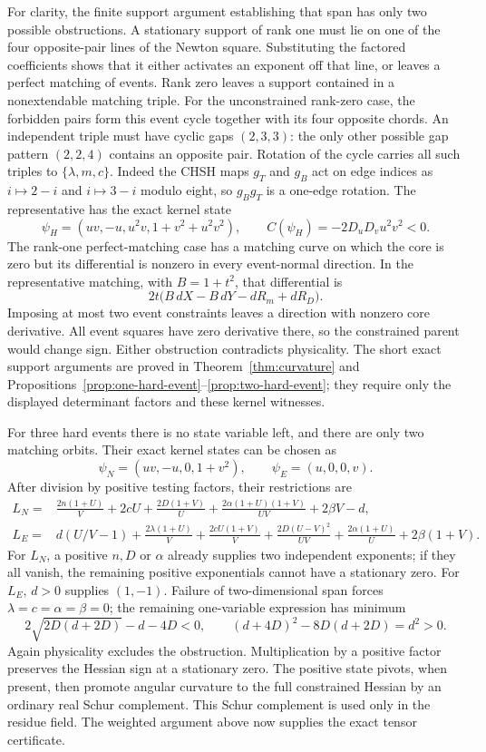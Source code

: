 For clarity, the finite support argument establishing that span has only
two possible obstructions.  A stationary support of rank one must lie on
one of the four opposite-pair lines of the Newton square.  Substituting the
factored coefficients shows that it either activates an exponent off that
line, or leaves a perfect matching of events.  Rank zero leaves a support
contained in a nonextendable matching triple.  For the unconstrained rank-zero case, the forbidden pairs form this
event cycle together with its four opposite chords.  An independent triple
must have cyclic gaps $(2,3,3)$: the only other possible gap pattern
$(2,2,4)$ contains an opposite pair.  Rotation of the cycle carries all such
triples to $\{\lambda,m,c\}$.  Indeed the CHSH maps $g_T$ and $g_B$ act on
edge indices as $i\mapsto2-i$ and $i\mapsto3-i$ modulo eight, so
$g_Bg_T$ is a one-edge rotation.  The representative has the exact kernel state
\[
 \psi_H=(uv,-u,u^2v,1+v^2+u^2v^2),\qquad
 C(\psi_H)=-2D_uD_vu^2v^2<0.
\]
The rank-one perfect-matching case has a
matching curve on which the core is zero but its differential is nonzero
in every event-normal direction.  In the representative matching, with
$B=1+t^2$, that differential is
\[
              2t\big(B\,dX-B\,dY-dR_m+dR_D\big).
\]
Imposing at most two event constraints leaves a direction with nonzero
core derivative.  All event squares have zero derivative there, so the
constrained parent would change sign.  Either obstruction contradicts
physicality.  The short exact support arguments are proved in
Theorem~\ref{thm:curvature} and
Propositions~\ref{prop:one-hard-event}--\ref{prop:two-hard-event}; they require
only the displayed determinant factors and these kernel witnesses.

For three hard events there is no state variable left, and there are only
two matching orbits.  Their exact kernel states can be chosen as
\[
 \psi_N=(uv,-u,0,1+v^2),\qquad \psi_E=(u,0,0,v).
\]
After division by positive testing factors, their restrictions are
\begin{align*}
 L_N={}&\frac{2n(1+U)}V+2cU+\frac{2D(1+V)}U
       +\frac{2\alpha(1+U)(1+V)}{UV}+2\beta V-d,\\
 L_E={}&d(U/V-1)+\frac{2\lambda(1+U)}V
       +\frac{2cU(1+V)}V+\frac{2D(U-V)^2}{UV}
       +\frac{2\alpha(1+U)}U+2\beta(1+V).
\end{align*}
For $L_N$, a positive $n,D$ or $\alpha$ already supplies two independent
exponents; if they all vanish, the remaining positive exponentials cannot
have a stationary zero.  For $L_E$, $d>0$ supplies $(1,-1)$.  Failure of
two-dimensional span forces $\lambda=c=\alpha=\beta=0$; the remaining
one-variable expression has minimum
\[
 2\sqrt{2D(d+2D)}-d-4D<0,
 \qquad (d+4D)^2-8D(d+2D)=d^2>0.
\]
Again physicality excludes the obstruction.  Multiplication by a positive
factor preserves the Hessian sign at a stationary zero.  The positive
state pivots, when present, then promote angular curvature to the full
constrained Hessian by an ordinary real Schur complement.  This Schur
complement is used only in the residue field.  The weighted argument above
now supplies the exact tensor certificate.

